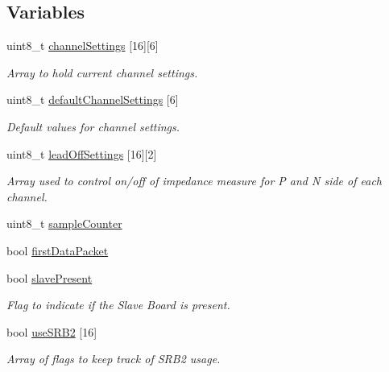 \subsection*{Variables}
\begin{DoxyCompactItemize}
\item 
uint8\+\_\+t \hyperlink{group___a_d_s1299___library_ga301925f8d0be3a235549a1d8a2775909}{channel\+Settings} \mbox{[}16\mbox{]}\mbox{[}6\mbox{]}
\begin{DoxyCompactList}\small\item\em Array to hold current channel settings. \end{DoxyCompactList}\item 
uint8\+\_\+t \hyperlink{group___a_d_s1299___library_ga0ec603fb6c5e40febc9a5139ef12969b}{default\+Channel\+Settings} \mbox{[}6\mbox{]}
\begin{DoxyCompactList}\small\item\em Default values for channel settings. \end{DoxyCompactList}\item 
uint8\+\_\+t \hyperlink{group___a_d_s1299___library_ga51cd0f121d75eaf14e9e4847f125dd8a}{lead\+Off\+Settings} \mbox{[}16\mbox{]}\mbox{[}2\mbox{]}
\begin{DoxyCompactList}\small\item\em Array used to control on/off of impedance measure for P and N side of each channel. \end{DoxyCompactList}\item 
uint8\+\_\+t \hyperlink{group___a_d_s1299___library_ga5413f90a1ad32d11a00aa20df8d9ba3c}{sample\+Counter}
\item 
bool \hyperlink{group___a_d_s1299___library_gadc787c1c2290ed1c985a4dc4cde9f1a3}{first\+Data\+Packet}
\item 
bool \hyperlink{group___a_d_s1299___library_ga4a8b8caa32595ce77863dd529953d13b}{slave\+Present}
\begin{DoxyCompactList}\small\item\em Flag to indicate if the Slave Board is present. \end{DoxyCompactList}\item 
bool \hyperlink{group___a_d_s1299___library_ga96bc68ed80305391fa5bbcc88557d776}{use\+S\+R\+B2} \mbox{[}16\mbox{]}
\begin{DoxyCompactList}\small\item\em Array of flags to keep track of S\+R\+B2 usage. \end{DoxyCompactList}\item 

\end{DoxyCompactItemize}

